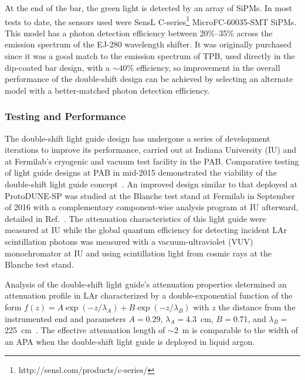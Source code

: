 
At the end of the bar, the green light is detected by an array of SiPMs. In most tests to date, the sensors used were SensL C-series\footnote{http://sensl.com/products/c-series/} MicroFC-60035-SMT SiPMs. This model has a photon detection efficiency between 20\%--35\% across the emission spectrum of the EJ-280 wavelength shifter. It was originally purchased since it was a good match to the emission spectrum of TPB, used directly in the dip-coated bar design, with a $\sim$40\% efficiency, so improvement in the overall performance of the double-shift design can be achieved by selecting an alternate model with a better-matched photon detection efficiency.

\subsubsection{Testing and Performance}

The double-shift light guide design has undergone a series of development iterations to improve its performance, carried out at Indiana University (IU) and at Fermilab's cryogenic and vacuum test facility in the PAB. Comparative testing of light guide designs at PAB in mid-2015 demonstrated the viability of the double-shift light guide concept~\cite{bib:JINST-11-C05019}. 
An improved design similar to that deployed at ProtoDUNE-SP was studied at the Blanche test stand at Fermilab in September of 2016 with a complementary component-wise analysis program at IU afterward, detailed in Ref.~\cite{bib:DoubleShiftLG-NIM-171113}. The attenuation characteristics of this light guide were measured at IU while the global quantum efficiency for detecting incident LAr scintillation photons was measured with a vacuum-ultraviolet (VUV) monochromator at IU and using scintillation light from cosmic rays at the Blanche test stand.


Analysis of the double-shift light guide's attenuation properties determined an attenuation profile in LAr characterized by a double-exponential function of the form $f(z) = A \exp(-z/\lambda_{A}) + B \exp(-z/\lambda_B)$ with $z$ the distance from the instrumented end and parameters $A = $0.29, $\lambda_A = $4.3~cm, $B = $0.71, and $\lambda_B = $225~cm~\cite{bib:DoubleShiftLG-NIM-171113}. The effective attenuation length of $\sim$\SI{2}{m}  is comparable to the width of an APA when the double-shift light guide is deployed in liquid argon.

